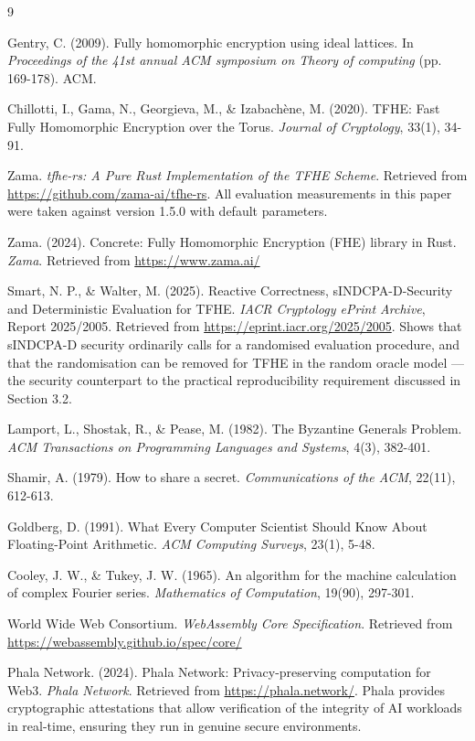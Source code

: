 \begin{thebibliography}{9}

Gentry, C. (2009). Fully homomorphic encryption using ideal lattices. In \textit{Proceedings of the 41st annual ACM symposium on Theory of computing} (pp. 169-178). ACM.

Chillotti, I., Gama, N., Georgieva, M., \& Izabach\`ene, M. (2020). TFHE: Fast Fully Homomorphic Encryption over the Torus. \textit{Journal of Cryptology}, 33(1), 34-91.

Zama. \textit{tfhe-rs: A Pure Rust Implementation of the TFHE Scheme}. Retrieved from \url{https://github.com/zama-ai/tfhe-rs}. All evaluation measurements in this paper were taken against version 1.5.0 with default parameters.

Zama. (2024). Concrete: Fully Homomorphic Encryption (FHE) library in Rust. \textit{Zama}. Retrieved from \url{https://www.zama.ai/}

Smart, N. P., \& Walter, M. (2025). Reactive Correctness, sINDCPA-D-Security and Deterministic Evaluation for TFHE. \textit{IACR Cryptology ePrint Archive}, Report 2025/2005. Retrieved from \url{https://eprint.iacr.org/2025/2005}. Shows that sINDCPA-D security ordinarily calls for a randomised evaluation procedure, and that the randomisation can be removed for TFHE in the random oracle model --- the security counterpart to the practical reproducibility requirement discussed in Section 3.2.

Lamport, L., Shostak, R., \& Pease, M. (1982). The Byzantine Generals Problem. \textit{ACM Transactions on Programming Languages and Systems}, 4(3), 382-401.

Shamir, A. (1979). How to share a secret. \textit{Communications of the ACM}, 22(11), 612-613.

Goldberg, D. (1991). What Every Computer Scientist Should Know About Floating-Point Arithmetic. \textit{ACM Computing Surveys}, 23(1), 5-48.

Cooley, J. W., \& Tukey, J. W. (1965). An algorithm for the machine calculation of complex Fourier series. \textit{Mathematics of Computation}, 19(90), 297-301.

World Wide Web Consortium. \textit{WebAssembly Core Specification}. Retrieved from \url{https://webassembly.github.io/spec/core/}

Phala Network. (2024). Phala Network: Privacy-preserving computation for Web3. \textit{Phala Network}. Retrieved from \url{https://phala.network/}. Phala provides cryptographic attestations that allow verification of the integrity of AI workloads in real-time, ensuring they run in genuine secure environments.

\end{thebibliography}
